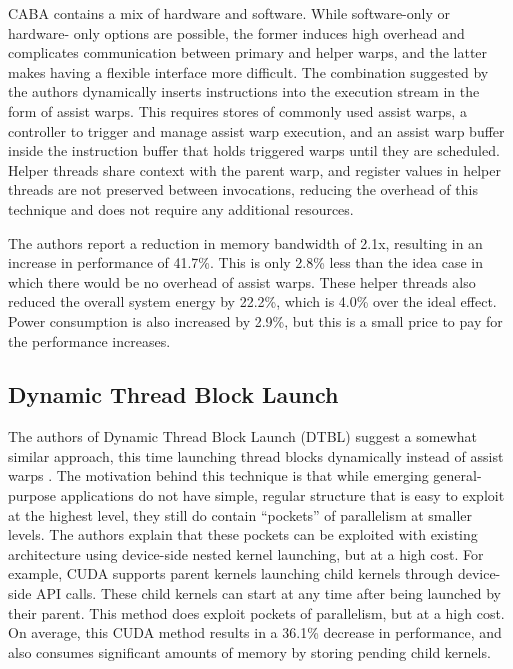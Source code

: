\documentclass[prodmode,acmtecs]{acmsmall} %
\begin{document}
CABA contains a mix of hardware and software. While software-only or hardware-
only options are possible, the former induces high overhead and complicates
communication between primary and helper warps, and the latter makes having a
flexible interface more difficult. The combination suggested by the authors
dynamically inserts instructions into the execution stream in the form of assist
warps. This requires stores of commonly used assist warps, a controller to
trigger and manage assist warp execution, and an assist warp buffer inside the
instruction buffer that holds triggered warps until they are scheduled. Helper
threads share context with the parent warp, and register values in helper
threads are not preserved between invocations, reducing the overhead of this
technique and does not require any additional resources.

The authors report a reduction in memory bandwidth of 2.1x, resulting in an
increase in performance of 41.7\%. This is only 2.8\% less than the idea case in
which there would be no overhead of assist warps. These helper threads also
reduced the overall system energy by 22.2\%, which is 4.0\% over the ideal
effect. Power consumption is also increased by 2.9\%, but this is a small price
to pay for the performance increases.

\subsection{Dynamic Thread Block Launch}
The authors of Dynamic Thread Block Launch (DTBL) suggest a somewhat similar
approach, this time launching thread blocks dynamically instead of assist warps
\cite{DynamicThreadBlockLaunch}. The motivation behind this technique is that
while emerging general-purpose applications do not have simple, regular
structure that is easy to exploit at the highest level, they still do contain
``pockets'' of parallelism at smaller levels. The authors explain that these
pockets can be exploited with existing architecture using device-side nested
kernel launching, but at a high cost. For example, CUDA supports parent kernels
launching child kernels through device-side API calls. These child kernels can
start at any time after being launched by their parent. This method does exploit
pockets of parallelism, but at a high cost. On average, this CUDA method results
in a 36.1\% decrease in performance, and also consumes significant amounts of
memory by storing pending child kernels.
\end{document}
